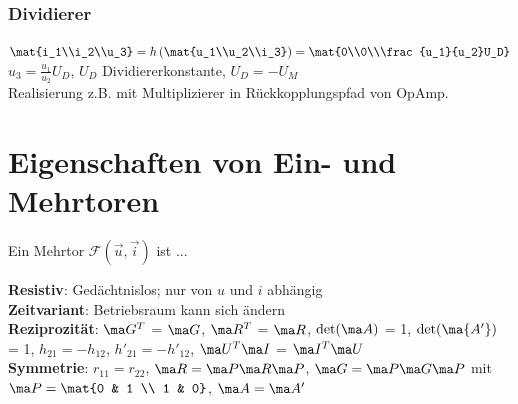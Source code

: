 \documentclass[fs, footer]{latex4ei}
\begin{document}
\begin{multicols*}{4}
    \subsubsection{Dividierer}
    $\mat{i_1\\i_2\\u_3} = h\left(\mat{u_1\\u_2\\i_3}\right) = \mat{0\\0\\\frac{u_1}{u_2}U_D}$\quad$u_3=\frac{u_1}{u_2}U_D$, $U_D$ Dividiererkonstante, $U_D = -U_M$\\
    Realisierung z.B. mit Multiplizierer in Rückkopplungspfad von OpAmp.
    \section{Eigenschaften von Ein- und Mehrtoren}
    Ein Mehrtor $\mathcal F(\vec u, \vec i)$ ist ...

    \textbf{Resistiv}: Gedächtnislos; nur von $u$ und $i$ abhängig\\
    \textbf{Zeitvariant}: Betriebsraum kann sich ändern\\
    \textbf{Reziprozität}: $\ma G^T$ = $\ma G$, $\ma R^T$ = $\ma R$, $\det (\ma A)$ = 1, $\det (\ma {A'})$ = 1, $h_{21} = -h_{12}$, $h'_{21} = -h'_{12}$, $\ma U^T\ma I$ = $\ma I^T\ma U$\\
    \textbf{Symmetrie}: $r_{11} = r_{22}$, $\ma R = \ma P\ma R\ma P$, $\ma G = \ma P \ma G \ma P$ mit $\ma P = \mat{0 & 1 \\ 1 & 0}$, $\ma A = \ma A'$



\end{multicols*}
\end{document}
